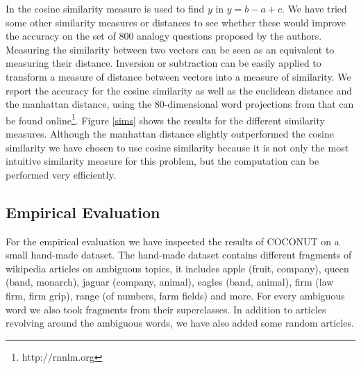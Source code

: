 \documentclass[11pt]{article}
\begin{document}
In \cite{Mikolov:13} the cosine similarity measure is used to find $y$ in $y = b - a + c$. We have tried some other similarity measures or distances to see whether these would improve the accuracy on the set of 800 analogy questions proposed by the authors. Measuring the similarity between two vectors can be seen as an equivalent to measuring their distance. Inversion or subtraction can be easily applied to transform a measure of distance between vectors into a measure of similarity. We report the accuracy for the cosine similarity as well as the euclidean distance and the manhattan distance, using the 80-dimensional word projections from \cite{Mikolov:13} that can be found online\footnote{http://rnnlm.org}. Figure \ref{sims} shows the results for the different similarity measures. Although the manhattan distance slightly outperformed the cosine similarity we have chosen to use cosine similarity because it is not only the most intuitive similarity measure for this problem, but the computation can be performed very efficiently. 

\subsection{Empirical Evaluation}
For the empirical evaluation we have inspected the results of COCONUT on a small hand-made dataset. The hand-made dataset contains different fragments of wikipedia articles on ambiguous topics, it includes apple (fruit, company), queen (band, monarch), jaguar (company, animal), eagles (band, animal), firm (law firm, firm grip), range (of numbers, farm fields) and more. For every ambiguous word we also took fragments from their superclasses. In addition to articles revolving around the ambiguous words, we have also added some random articles.
\end{document}
